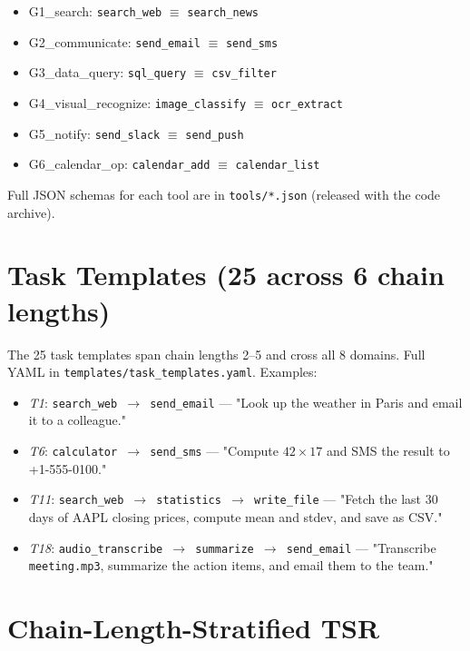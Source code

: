 ﻿\documentclass{article}
\begin{document}
\begin{itemize}
    \item G1\_search: \texttt{search\_web} $\equiv$ \texttt{search\_news}
    \item G2\_communicate: \texttt{send\_email} $\equiv$ \texttt{send\_sms}
    \item G3\_data\_query: \texttt{sql\_query} $\equiv$ \texttt{csv\_filter}
    \item G4\_visual\_recognize: \texttt{image\_classify} $\equiv$ \texttt{ocr\_extract}
    \item G5\_notify: \texttt{send\_slack} $\equiv$ \texttt{send\_push}
    \item G6\_calendar\_op: \texttt{calendar\_add} $\equiv$ \texttt{calendar\_list}
\end{itemize}

Full JSON schemas for each tool are in \texttt{tools/*.json} (released with the
code archive).

\section{Task Templates (25 across 6 chain lengths)}
\label{app:templates}

The 25 task templates span chain lengths 2--5 and cross all 8 domains. Full
YAML in \texttt{templates/task\_templates.yaml}. Examples:

\begin{itemize}
    \item \emph{T1}: \texttt{search\_web $\to$ send\_email} --- "Look up the
          weather in Paris and email it to a colleague."
    \item \emph{T6}: \texttt{calculator $\to$ send\_sms} --- "Compute
          $42 \times 17$ and SMS the result to +1-555-0100."
    \item \emph{T11}: \texttt{search\_web $\to$ statistics $\to$ write\_file}
          --- "Fetch the last 30 days of AAPL closing prices, compute mean and
          stdev, and save as CSV."
    \item \emph{T18}: \texttt{audio\_transcribe $\to$ summarize $\to$ send\_email}
          --- "Transcribe \texttt{meeting.mp3}, summarize the action items,
          and email them to the team."
\end{itemize}



\section{Chain-Length-Stratified TSR}
\end{document}
